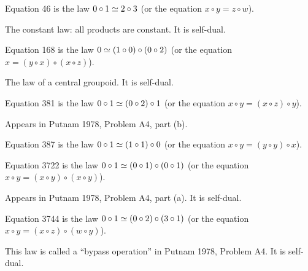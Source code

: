 \begin{definition}[Equation 46]\label{eq46}\leanok{}  Equation 46 is the law $0 \circ 1  \simeq  2 \circ 3$ (or the equation $x \circ y = z \circ w$).
\end{definition}

The constant law: all products are constant. It is self-dual.

\begin{definition}[Equation 168]\label{eq168}\leanok{}  Equation 168 is the law $0  \simeq  (1 \circ 0) \circ (0 \circ 2)$ (or the equation $x = (y \circ x) \circ (x \circ z)$).
\end{definition}

The law of a central groupoid. It is self-dual.

\begin{definition}[Equation 381]\label{eq381}\leanok{}  Equation 381 is the law $0 \circ 1  \simeq  (0 \circ 2) \circ 1$ (or the equation $x \circ y = (x \circ z) \circ y$).
\end{definition}

Appears in Putnam 1978, Problem A4, part (b).

\begin{definition}[Equation 387]\label{eq387}\leanok{}  Equation 387 is the law $0 \circ 1  \simeq  (1 \circ 1) \circ 0$ (or the equation $x \circ y = (y \circ y) \circ x$).
\end{definition}

\begin{definition}[Equation 3722]\label{eq3722}\leanok{}  Equation 3722 is the law $0 \circ 1  \simeq  (0 \circ 1) \circ (0 \circ 1)$ (or the equation $x \circ y = (x \circ y) \circ (x \circ y)$).
\end{definition}

Appears in Putnam 1978, Problem A4, part (a).  It is self-dual.

\begin{definition}[Equation 3744]\label{eq3744}\leanok{}  Equation 3744 is the law $0 \circ 1  \simeq  (0 \circ 2) \circ (3 \circ 1)$ (or the equation $x \circ y = (x \circ z) \circ (w \circ y)$).
\end{definition}

This law is called a ``bypass operation'' in Putnam 1978, Problem A4. It is self-dual.

